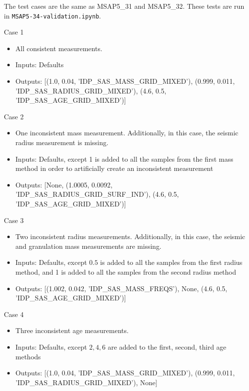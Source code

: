 \documentclass[a4paper, oneside, 11pt, article, english]{memoir}
\begin{document}
The test cases are the same as MSAP5\_31 and MSAP5\_32.  These tests are run in \texttt{MSAP5-34-validation.ipynb}. 

Case 1
  \begin{itemize}
      \firmlist
      \item All consistent measurements. 
      \item Inputs: Defaults
      \item Outputs: [(1.0, 0.04, 'IDP\_SAS\_MASS\_GRID\_MIXED'), (0.999, 0.011, 'IDP\_SAS\_RADIUS\_GRID\_MIXED'), (4.6, 0.5, 'IDP\_SAS\_AGE\_GRID\_MIXED')]
  \end{itemize}

Case 2
  \begin{itemize}
      \firmlist
      \item One inconsistent mass measurement. Additionally, in this case, the seismic radius measurement is missing.
      \item Inputs: Defaults, except 1 is added to all the samples from the first mass method in order to artificially create an inconsistent measurement 
      \item Outputs: [None, (1.0005, 0.0092, 'IDP\_SAS\_RADIUS\_GRID\_SURF\_IND'), (4.6, 0.5, 'IDP\_SAS\_AGE\_GRID\_MIXED')]
  \end{itemize}

Case 3
  \begin{itemize}
      \firmlist
      \item Two inconsistent radius measurements. Additionally, in this case, the seismic and granulation mass measurements are missing. 
      \item Inputs: Defaults, except $0.5$ is added to all the samples from the first radius method, and 1 is added to all the samples from the second radius method
      \item Outputs: [(1.002, 0.042, 'IDP\_SAS\_MASS\_FREQS'), None, (4.6, 0.5, 'IDP\_SAS\_AGE\_GRID\_MIXED')]
  \end{itemize}

Case 4
  \begin{itemize}
      \firmlist
      \item Three inconsistent age measurements. 
      \item Inputs: Defaults, except $2,4,6$ are added to the first, second, third age methods 
      \item Outputs: [(1.0, 0.04, 'IDP\_SAS\_MASS\_GRID\_MIXED'), (0.999, 0.011, 'IDP\_SAS\_RADIUS\_GRID\_MIXED'), None]
  \end{itemize}
\end{document}
